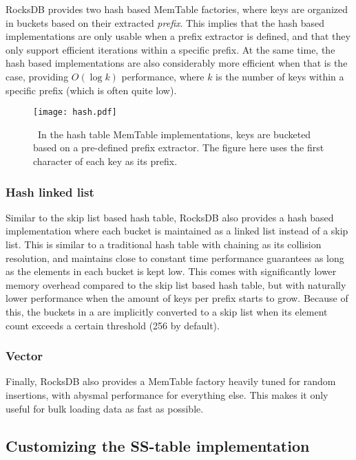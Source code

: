 RocksDB provides two hash based MemTable factories, where keys are organized in
buckets based on their extracted \textit{prefix}. This implies that the hash
based implementations are only usable when a prefix extractor is defined, and
that they only support efficient iterations within a specific prefix. At the
same time, the hash based implementations are also considerably more efficient
when that is the case, providing $ O(\log k) $ performance, where $ k $ is the
number of keys within a specific prefix (which is often quite low).

\begin{figure}[H]
  \centering
  \texttt{[image: hash.pdf]}
  \caption{\
    In the hash table MemTable implementations, keys are bucketed based on a
    pre-defined prefix extractor. The figure here uses the first character of
    each key as its prefix.
  }\label{fig:hash}
\end{figure}

\subsubsection{Hash linked list}

Similar to the skip list based hash table, RocksDB also provides a hash based
implementation where each bucket is maintained as a linked list instead of a
skip list. This is similar to a traditional hash table with chaining as its
collision resolution, and maintains close to constant time performance
guarantees as long as the elements in each bucket is kept low. This comes with
significantly lower memory overhead compared to the skip list based hash table,
but with naturally lower performance when the amount of keys per prefix starts
to grow. Because of this, the buckets in a \code{HashLinkList} are implicitly
converted to a skip list when its element count exceeds a certain threshold (256
by default).

\subsubsection{Vector}

Finally, RocksDB also provides a MemTable factory heavily tuned for random
insertions, with abysmal performance for everything else. This makes it only
useful for bulk loading data as fast as possible.

\subsection{Customizing the SS-table implementation}\label{sec:ss-table}

